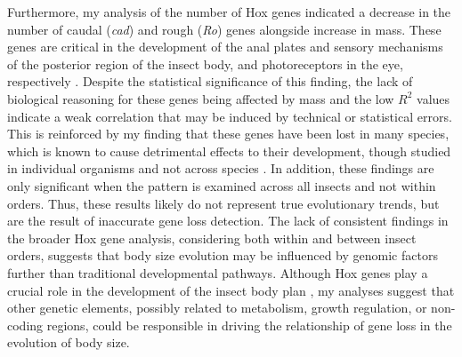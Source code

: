 \documentclass[11pt]{article}
\begin{document}
Furthermore, my analysis of the number of Hox genes indicated a decrease in the number of caudal (\textit{cad}) and rough (\textit{Ro}) genes alongside increase in mass. These genes are critical in the development of the anal plates and sensory mechanisms of the posterior region of the insect body, and photoreceptors in the eye, respectively \citep{rough, caudal}. Despite the statistical significance of this finding, the lack of biological reasoning for these genes being affected by mass and the low $R^2$ values indicate a weak correlation that may be induced by technical or statistical errors. This is reinforced by my finding that these genes have been lost in many species, which is known to cause detrimental effects to their development, though studied in individual organisms and not across species \citep{rough, caudal}. In addition, these findings are only significant when the pattern is examined across all insects and not within orders. Thus, these results likely do not represent true evolutionary trends, but are the result of inaccurate gene loss detection. The lack of consistent findings in the broader Hox gene analysis, considering both within and between insect orders, suggests that body size evolution may be influenced by genomic factors further than traditional developmental pathways. Although Hox genes play a crucial role in the development of the insect body plan \citep{hox-length}, my analyses suggest that other genetic elements, possibly related to metabolism, growth regulation, or non-coding regions, could be responsible in driving the relationship of gene loss in the evolution of body size. 
\end{document}
